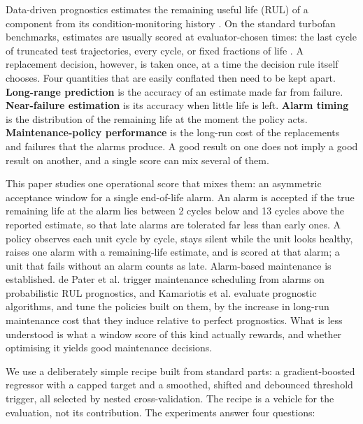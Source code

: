 \documentclass[a4paper,fleqn,doubleblind]{cas-dc}
\begin{document}
Data-driven prognostics estimates the remaining useful life (RUL) of a component from its condition-monitoring history \cite{lei2018,si2011}. On the standard turbofan benchmarks, estimates are usually scored at evaluator-chosen times: the last cycle of truncated test trajectories, every cycle, or fixed fractions of life \cite{ramasso2014}. A replacement decision, however, is taken once, at a time the decision rule itself chooses. Four quantities that are easily conflated then need to be kept apart. \textbf{Long-range prediction} is the accuracy of an estimate made far from failure. \textbf{Near-failure estimation} is its accuracy when little life is left. \textbf{Alarm timing} is the distribution of the remaining life at the moment the policy acts. \textbf{Maintenance-policy performance} is the long-run cost of the replacements and failures that the alarms produce. A good result on one does not imply a good result on another, and a single score can mix several of them.

This paper studies one operational score that mixes them: an asymmetric acceptance window for a single end-of-life alarm. An alarm is accepted if the true remaining life at the alarm lies between 2 cycles below and 13 cycles above the reported estimate, so that late alarms are tolerated far less than early ones. A policy observes each unit cycle by cycle, stays silent while the unit looks healthy, raises one alarm with a remaining-life estimate, and is scored at that alarm; a unit that fails without an alarm counts as late. Alarm-based maintenance is established. de Pater et al. \cite{depater2022} trigger maintenance scheduling from alarms on probabilistic RUL prognostics, and Kamariotis et al. \cite{kamariotis2024} evaluate prognostic algorithms, and tune the policies built on them, by the increase in long-run maintenance cost that they induce relative to perfect prognostics. What is less understood is what a window score of this kind actually rewards, and whether optimising it yields good maintenance decisions.

We use a deliberately simple recipe built from standard parts: a gradient-boosted regressor with a capped target and a smoothed, shifted and debounced threshold trigger, all selected by nested cross-validation. The recipe is a vehicle for the evaluation, not its contribution. The experiments answer four questions:
\end{document}

